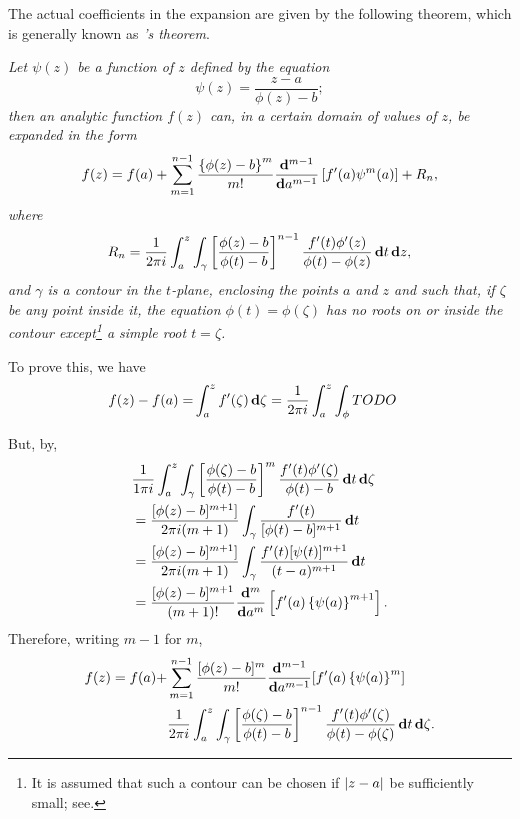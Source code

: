 The actual coefficients in the expansion are given by the following
theorem, which is generally known as \emph{\Burmann's theorem}.

\emph{Let $\psi(z)$ be a function of $z$ defined by the equation
$$
\psi(z) = \frac{z-a}{ \phi(z) - b };
$$
then an analytic function $f(z)$ can, in a certain domain of values of
$z$, be expanded in the form
$$
f(z)
=
f(a)
+
\sum_{m=1}^{n-1}
\frac{ \left\{ \phi(z)-b \right\}^{m} }{m!}
\frac{\mathbf{d}^{m-1}}{\mathbf{d} a^{m-1}}
\left[ 
  f'(a) \psi^{m}(a)
 \right]
+
R_{n},
$$
where
$$
R_{n}
=
\frac{1}{2 \pi i}
\int_{a}^{z}
\int_{\gamma}
\left[ 
  \frac{\phi(z) - b}{\phi(t) - b}
 \right]^{n-1}
\frac{ f'(t) \phi'(z) }{\phi(t) - \phi(z)}
\, \mathbf{d} t \, \mathbf{d} z,
$$
and $\gamma$ is a contour in the $t$-plane, enclosing the points $a$
and $z$ and such that, if $\zeta$ be any point inside it, the equation
$\phi(t) = \phi(\zeta)$ has no roots on or inside the contour
except\footnote{It is assumed that such a contour can be chosen if
  $\left| z - a \right|$ be sufficiently small;
  see.} a simple root $t=\zeta$.
}

To prove this, we have
\begin{align*}
  f(z) - f(a)
  = &
  \int_{a}^{z} f'(\zeta) \, \mathbf{d} \zeta
  = \frac{1}{2 \pi i} \int_{a}^{z} \int_{\phi} TODO
\end{align*}

%
%

But, by,
\begin{align*}
  &
  \frac{1}{1 \pi i}
  \int_{a}^{z} \int_{\gamma}
  \left[  \frac{\phi(\zeta) - b}{\phi(t) - b}  \right]^{m}
  \frac{f'(t)\phi'(\zeta)}{\phi(t) - b}
  \, \mathbf{d} t \, \mathbf{d} \zeta
  \\
  &=
  \frac{ [\phi(z) - b]^{m+1}] }{2 \pi i (m+1)}
  \int_{\gamma} \frac{f'(t)}{[\phi(t) - b]^{m+1}} \, \mathbf{d} t
  \\
  &=
  \frac{ [\phi(z) - b]^{m+1}] }{2 \pi i (m+1)}
  \int_{\gamma}
  \frac{ f'(t) [\psi(t)]^{m+1} }{ (t-a)^{m+1} }
  \, \mathbf{d} t
  \\
  &=
  \frac{ [\phi(z) - b ]^{m+1} }{ (m+1)! }
  \frac{ \mathbf{d}^{m} }{ \mathbf{d} a^{m} }
  \left[  f'(a) \left\{ \psi(a) \right\}^{m+1}  \right].
\end{align*}
Therefore, writing
$m - 1$ for $m$,
\begin{align*}
  f(z) = f(a) +
  &
  \sum_{m=1}^{n-1}
  \frac{ [\phi(z) - b]^{m} }{m!}
  \frac{\mathbf{d}^{m-1}}{\mathbf{d} a^{m-1}}
  [ f'(a) \left\{  \psi(a)  \right\}^{m} ]
  \\
  &
  \frac{1}{2 \pi i}
  \int_{a}^{z} \int_{\gamma}
  \left[ 
    \frac{\phi(\zeta) - b}{\phi(t) - b}
   \right]^{n-1}
  \frac{f'(t) \phi'(\zeta)}{\phi(t) - \phi(\zeta)}
  \, \mathbf{d} t \, \mathbf{d} \zeta.
\end{align*}

